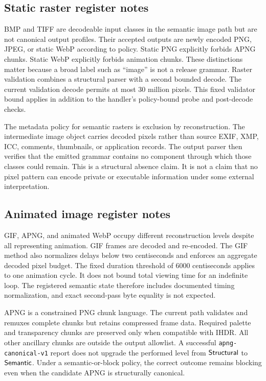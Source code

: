 \subsection{Static raster register notes}

BMP and TIFF are decodeable input classes in the semantic image path but are
not canonical output profiles.  Their accepted outputs are newly encoded PNG,
JPEG, or static WebP according to policy.  Static PNG explicitly forbids APNG
chunks.  Static WebP explicitly forbids animation chunks.  These distinctions
matter because a broad label such as ``image'' is not a release grammar.
Raster validation combines a structural parser with a second bounded decode.
The current validation decode permits at most 30 million pixels.  This fixed
validator bound applies in addition to the handler's policy-bound probe and
post-decode checks.

The metadata policy for semantic rasters is exclusion by reconstruction.  The
intermediate image object carries decoded pixels rather than source EXIF, XMP,
ICC, comments, thumbnails, or application records.  The output parser then
verifies that the emitted grammar contains no component through which those
classes could remain.  This is a structural absence claim.  It is not a claim
that no pixel pattern can encode private or executable information under some
external interpretation.

\subsection{Animated image register notes}

GIF, APNG, and animated WebP occupy different reconstruction levels despite all
representing animation.  GIF frames are decoded and re-encoded.  The GIF method also
normalizes delays below two centiseconds and enforces an aggregate decoded
pixel budget. The fixed duration threshold of 6000 centiseconds applies to one
animation cycle. It does not bound total viewing time for an indefinite loop.
The registered semantic state therefore includes documented timing
normalization, and exact second-pass byte equality is not expected.

APNG is a constrained PNG chunk language.  The current path validates and
remuxes complete chunks but retains compressed frame data.  Required palette
and transparency chunks are preserved only when compatible with IHDR.  All
other ancillary chunks are outside the output allowlist.  A successful
\texttt{apng-canonical-v1} report does not upgrade the performed level from
$\mathsf{Structural}$ to $\mathsf{Semantic}$.  Under a semantic-or-block policy, the correct
outcome remains blocking even when the candidate APNG is structurally
canonical.

